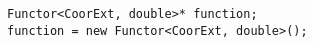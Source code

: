 \begin{verbatim}
Functor<CoorExt, double>* function;
function = new Functor<CoorExt, double>();
\end{verbatim}
